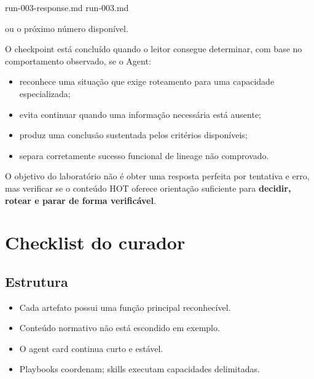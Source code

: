 \documentclass[
  10pt,
  a4paper,
  oneside]{book}
\newenvironment{Shaded}{}{}
\newcommand{\NormalTok}[1]{#1}
\providecommand{\tightlist}{%
  \setlength{\itemsep}{0pt}\setlength{\parskip}{0pt}}
\renewenvironment{Shaded}{\begin{snugshade}}{\end{snugshade}}%
\begin{document}
\begin{Shaded}
\begin{Highlighting}[]
\NormalTok{run{-}003{-}response.md}
\NormalTok{run{-}003.md}
\end{Highlighting}
\end{Shaded}

ou o próximo número disponível.

O checkpoint está concluído quando o leitor consegue determinar, com
base no comportamento observado, se o Agent:

\begin{itemize}
\tightlist
\item
  reconhece uma situação que exige roteamento para uma capacidade
  especializada;
\item
  evita continuar quando uma informação necessária está ausente;
\item
  produz uma conclusão sustentada pelos critérios disponíveis;
\item
  separa corretamente sucesso funcional de lineage não comprovado.
\end{itemize}

O objetivo do laboratório não é obter uma resposta perfeita por
tentativa e erro, mas verificar se o conteúdo HOT oferece orientação
suficiente para \textbf{decidir, rotear e parar de forma verificável}.

\hypertarget{checklist-do-curador}{%
\section{Checklist do curador}\label{checklist-do-curador}}

\small

\hypertarget{estrutura}{%
\subsection{Estrutura}\label{estrutura}}

\begin{itemize}
\tightlist
\item[$\square$]
  Cada artefato possui uma função principal reconhecível.
\item[$\square$]
  Conteúdo normativo não está escondido em exemplo.
\item[$\square$]
  O agent card continua curto e estável.
\item[$\square$]
  Playbooks coordenam; skills executam capacidades delimitadas.
\end{itemize}
\end{document}
